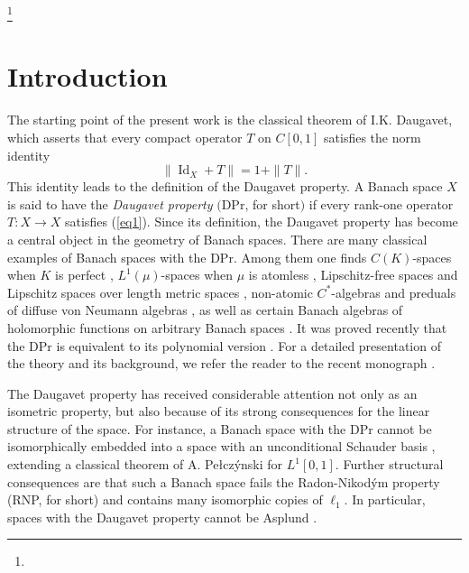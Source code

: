 \documentclass[a4paper,12pt]{amsart}
\theoremstyle{definition}
\theoremstyle{definition}
\theoremstyle{remark}
\numberwithin{equation}{section}
\DeclareMathOperator{\id}{Id}
\newcommand{\<}{\langle}
\renewcommand{\>}{\rangle}
\begin{document}
	
	
	
	
	
	
	\thanks{ }
	
	
	\maketitle
	
	\tableofcontents
	
	\thispagestyle{plain}
	
	
	
	
	
	
	
	
	
	
	
	
	\section{Introduction} The starting point of the present work is the classical theorem of I.K. Daugavet, which asserts that every compact operator $T$ on $C[0,1]$ satisfies the norm identity
	\begin{equation} \label{eq1}
		\|\id_X+T\|=1+\|T\|.
	\end{equation}
	This identity leads to the definition of the Daugavet property. A Banach space $X$ is said to have the \emph{Daugavet property} $($DPr, for short$)$ if every rank-one operator $T:X\to X$ satisfies (\ref{eq1}). Since its definition, the Daugavet property has become a central object in the geometry of Banach spaces. There are many classical examples of Banach spaces with the DPr. Among them one finds $C(K)$-spaces when $K$ is perfect \cite{Daugavet1963}, $L^1(\mu)$-spaces when $\mu$ is atomless \cite{Lozanovskii66}, Lipschitz-free spaces and Lipschitz spaces over length metric spaces \cite{IKW07,GLPRZ18}, non-atomic $C^*$-algebras and preduals of diffuse von Neumann algebras \cite{BM05,Oik02}, as well as certain Banach algebras of holomorphic functions on arbitrary Banach spaces \cite{Jung2023,Werner97,Wojtaszcyk92}. It was proved recently that the DPr is equivalent to its polynomial version \cite{DantasMartinPerreau2025}. For a detailed presentation of the theory and its background, we refer the reader to the recent monograph \cite{KMRW}. 
	
	
	The Daugavet property has received considerable attention not only as an isometric property, but also because of its strong consequences for the linear structure of the space. For instance, a Banach space with the DPr cannot be isomorphically embedded into a space with an unconditional Schauder basis \cite{Kadets2000}, extending a classical theorem of A. Pe{\l}czýnski for $L^1[0,1]$. Further structural consequences are that such a Banach space fails the Radon-Nikodým property (RNP, for short) and contains many isomorphic copies of $\ell_1$. In particular, spaces with the Daugavet property cannot be Asplund \cite{KMRW, Kadets2000}.
	
\end{document}

